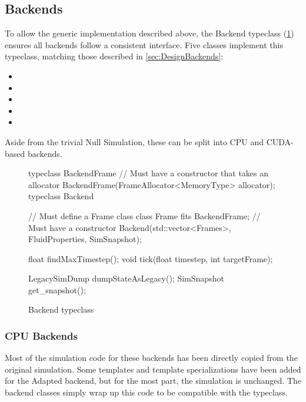 \subsection{Backends}
To allow the generic implementation described above, the Backend typeclass (\cref{fig:TypeclassBackend}) ensures all backends follow a consistent interface.
Five classes implement this typeclass, matching those described in \cref{sec:DesignBackends}:
\begin{itemize}
    \item {}
    \item {}
    \item {}
    \item {}
    \item {}
\end{itemize}
Aside from the trivial Null Simulation, these can be split into CPU and CUDA-based backends.

\begin{figure}
    \centering
\begin{cppcode}
typeclass BackendFrame {
    // Must have a constructor that takes an allocator
    BackendFrame(FrameAllocator<MemoryType> allocator);
}
typeclass Backend {
    // Must define a Frame class
    class Frame fits BackendFrame;
    // Must have a constructor
    Backend(std::vector<Frames>, FluidProperties, SimSnapshot);
    
    float findMaxTimestep();
    void tick(float timestep, int targetFrame);
    
    LegacySimDump dumpStateAsLegacy();
    SimSnapshot get_snapshot();
}    
\end{cppcode}
    \caption{Backend typeclass}
    \label{fig:TypeclassBackend}
\end{figure}

\subsubsection{CPU Backends}
Most of the simulation code for these backends has been directly copied from the original simulation\cite{modules:CS257Coursework}\cite{modules:aca257submission}.
Some templates and template specializations have been added for the Adapted backend, but for the most part, the simulation is unchanged.
The backend classes simply wrap up this code to be compatible with the typeclass.

